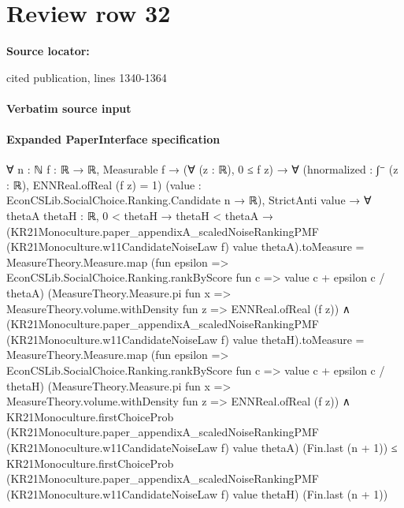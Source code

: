 \documentclass[10pt]{article}
\begin{document}
\section*{Review row 32}
\textbf{Source locator:} {\footnotesize\raggedright cited publication, lines 1340-\allowbreak{}1364\par}
\paragraph{Verbatim source input}
\begin{ReviewVerbatim}
\end{ReviewVerbatim}


\paragraph{Expanded PaperInterface specification}
\begin{ReviewVerbatim}
∀ {n : ℕ} {f : ℝ → ℝ},
  Measurable f →
    (∀ (z : ℝ), 0 ≤ f z) →
      ∀ (hnormalized : ∫⁻ (z : ℝ), ENNReal.ofReal (f z) = 1) (value : EconCSLib.SocialChoice.Ranking.Candidate n → ℝ),
        StrictAnti value →
          ∀ {thetaA thetaH : ℝ},
            0 < thetaH →
              thetaH < thetaA →
                (KR21Monoculture.paper_appendixA_scaledNoiseRankingPMF (KR21Monoculture.w11CandidateNoiseLaw f) value
                        thetaA).toMeasure =
                    MeasureTheory.Measure.map
                      (fun epsilon => EconCSLib.SocialChoice.Ranking.rankByScore fun c => value c + epsilon c / thetaA)
                      (MeasureTheory.Measure.pi fun x =>
                        MeasureTheory.volume.withDensity fun z => ENNReal.ofReal (f z)) ∧
                  (KR21Monoculture.paper_appendixA_scaledNoiseRankingPMF (KR21Monoculture.w11CandidateNoiseLaw f) value
                          thetaH).toMeasure =
                      MeasureTheory.Measure.map
                        (fun epsilon =>
                          EconCSLib.SocialChoice.Ranking.rankByScore fun c => value c + epsilon c / thetaH)
                        (MeasureTheory.Measure.pi fun x =>
                          MeasureTheory.volume.withDensity fun z => ENNReal.ofReal (f z)) ∧
                    KR21Monoculture.firstChoiceProb
                        (KR21Monoculture.paper_appendixA_scaledNoiseRankingPMF (KR21Monoculture.w11CandidateNoiseLaw f)
                          value thetaA)
                        (Fin.last (n + 1)) ≤
                      KR21Monoculture.firstChoiceProb
                        (KR21Monoculture.paper_appendixA_scaledNoiseRankingPMF (KR21Monoculture.w11CandidateNoiseLaw f)
                          value thetaH)
                        (Fin.last (n + 1))
\end{ReviewVerbatim}
\end{document}
